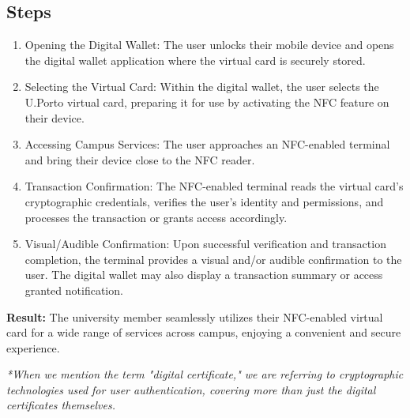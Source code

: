 \documentclass{article}
\begin{document}
\subsection*{Steps}
\begin{enumerate}
    \item Opening the Digital Wallet: The user unlocks their mobile device and opens the digital wallet application where the virtual card is securely stored.
    \item Selecting the Virtual Card: Within the digital wallet, the user selects the U.Porto virtual card, preparing it for use by activating the NFC feature on their device.
    \item Accessing Campus Services: The user approaches an NFC-enabled terminal and bring their device close to the NFC reader.
    \item Transaction Confirmation: The NFC-enabled terminal reads the virtual card's cryptographic credentials, verifies the user's identity and permissions, and processes the transaction or grants access accordingly.
    \item Visual/Audible Confirmation: Upon successful verification and transaction completion, the terminal provides a visual and/or audible confirmation to the user. The digital wallet may also display a transaction summary or access granted notification.
\end{enumerate}

\textbf{Result:} The university member seamlessly utilizes their NFC-enabled virtual card for a wide range of services across campus, enjoying a convenient and secure experience.




\textit{*When we mention the term "digital certificate," we are referring to cryptographic technologies used for user authentication, covering more than just the digital certificates themselves.}
\end{document}
